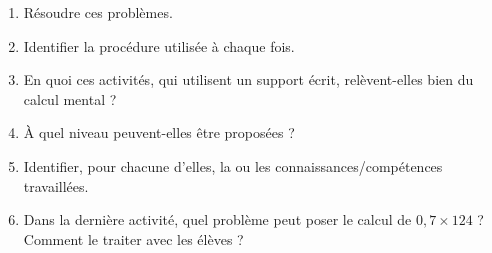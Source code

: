 \begin{exercice}
\begin{center}
\end{center}
\begin{enumerate}
   \item Résoudre ces problèmes.
   \item Identifier la procédure utilisée à chaque fois.
   \item En quoi ces activités, qui utilisent un support écrit, relèvent-elles bien du calcul mental ?
   \item À quel niveau peuvent-elles être proposées ?
   \item Identifier, pour chacune d'elles, la ou les connaissances/compétences  travaillées.
   \item Dans la dernière activité, quel problème peut poser le calcul de $0,7\times 124$ ?
Comment le traiter avec les élèves ?
\end{enumerate}
\medskip
\end{exercice}

